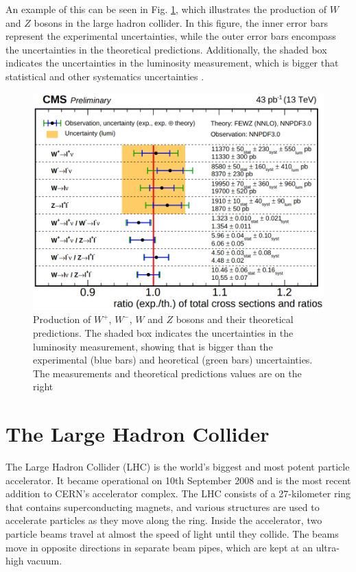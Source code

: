 An example of this can be seen in Fig. \ref{lumi_incertainty}, which illustrates the production of $W$ and $Z$ bosons in the large hadron collider. In this figure, the inner error bars represent the experimental uncertainties, while the outer error bars encompass the uncertainties in the theoretical predictions. Additionally, the shaded box indicates the uncertainties in the luminosity measurement, which is bigger that statistical and other systematics uncertainties \cite{lumi_uncertainties}.

\begin{center}
  \begin{figure}[h]
    \centering
\includegraphics[scale=.28]{Chapter1/lumi_uncertainty.png} 
 \caption[Luminosity uncertainty in a process]{Production of $W^+$, $W^-$, $W$ and $Z$ bosons and their theoretical predictions. The shaded box indicates the uncertainties in the luminosity measurement, showing that is bigger than the experimental (blue bars) and heoretical (green bars) uncertainties. The measurements and theoretical predictions values are on the right}
    \label{lumi_incertainty}
  \end{figure}
\end{center}


\section{The Large Hadron Collider}
 
The Large Hadron Collider (LHC) is the world's biggest and most potent particle accelerator. It became operational on 10th September 2008 and is the most recent addition to CERN's accelerator complex. The LHC consists of a 27-kilometer ring that contains superconducting magnets, and various structures are used to accelerate particles as they move along the ring. Inside the accelerator, two particle beams travel at almost the speed of light until they collide. The beams move in opposite directions in separate beam pipes, which are kept at an ultra-high vacuum.\\ 

